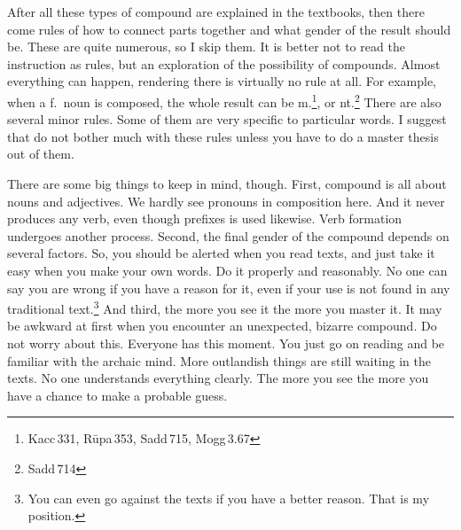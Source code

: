After all these types of compound are explained in the textbooks, then there come rules of how to connect parts together and what gender of the result should be. These are quite numerous, so I skip them. It is better not to read the instruction as rules, but an exploration of the possibility of compounds. Almost everything can happen, rendering there is virtually no rule at all. For example, when a f.\ noun is composed, the whole result can be m.\footnote{Kacc\,331, R\=upa\,353, Sadd\,715, Mogg\,3.67}, or nt.\footnote{Sadd\,714} There are also several minor rules. Some of them are very specific to particular words. I suggest that do not bother much with these rules unless you have to do a master thesis out of them.

There are some big things to keep in mind, though. First, compound is all about nouns and adjectives. We hardly see pronouns in composition here. And it never produces any verb, even though prefixes is used likewise. Verb formation undergoes another process. Second, the final gender of the compound depends on several factors. So, you should be alerted when you read texts, and just take it easy when you make your own words. Do it properly and reasonably. No one can say you are wrong if you have a reason for it, even if your use is not found in any traditional text.\footnote{You can even go against the texts if you have a better reason. That is my position.} And third, the more you see it the more you master it. It may be awkward at first when you encounter an unexpected, bizarre compound. Do not worry about this. Everyone has this moment. You just go on reading and be familiar with the archaic mind. More outlandish things are still waiting in the texts. No one understands everything clearly. The more you see the more you have a chance to make a probable guess.
